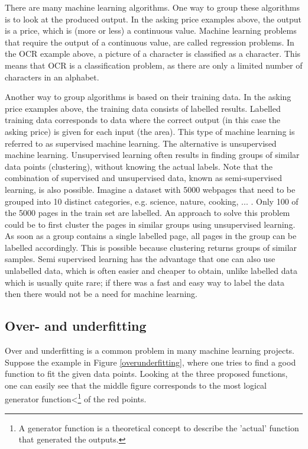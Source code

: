 There are many machine learning algorithms. One way to group these algorithms is to look at the produced output. In the asking price examples above, the output is a price, which is (more or less) a continuous value. Machine learning problems that require the output of a continuous value, are called regression problems\citep{prml}. In the OCR example above, a picture of a character is classified as a character. This means that OCR is a classification problem, as there are only a limited number of characters in an alphabet\citep{prml}.

\npar

Another way to group algorithms is based on their training data\citep{prml}. In the asking price examples above, the training data consists of labelled results. Labelled training data corresponds to data where the correct output (in this case the asking price) is given for each input (the area). This type of machine learning is referred to as supervised machine learning\citep{prml}. The alternative is unsupervised machine learning\citep{prml}. Unsupervised learning often results in finding groups of similar data points (clustering), without knowing the actual labels. Note that the combination of supervised and unsupervised data, known as semi-supervised learning, is also possible\citep{semiSup}. Imagine a dataset with 5000 webpages that need to be grouped into 10 distinct categories, e.g. science, nature, cooking, ... . Only 100 of the 5000 pages in the train set are labelled. An approach to solve this problem could be to first cluster the pages in similar groups using unsupervised learning. As soon as a group contains a single labelled page, all pages in the group can be labelled accordingly. This is possible because clustering returns groups of similar samples. Semi supervised learning has the advantage that one can also use unlabelled data, which is often easier and cheaper to obtain, unlike labelled data which is usually quite rare; if there was a fast and easy way to label the data then there would not be a need for machine learning.

\subsection{Over- and underfitting}

Over and underfitting is a common problem in many machine learning projects\citep{prml}. Suppose the example in Figure \ref{overunderfitting}, where one tries to find a good function to fit the given data points. Looking at the three proposed functions, one can easily see that the middle figure corresponds to the most logical generator function<\footnote{A generator function is a theoretical concept to describe the 'actual' function that generated the outputs.} of the red points.

